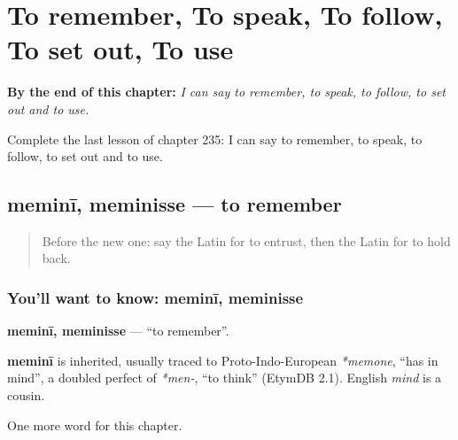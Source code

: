 
\chapter{To remember, To speak, To follow, To set out, To use}
\label{ch:la-to-remember-to-speak-to-follow-to-set-out-to-use}

\begin{chapteropening}
\textbf{By the end of this chapter:} \emph{I can say to remember, to speak, to follow, to set out and to use.}

Complete the last lesson of chapter 235: I can say to remember, to speak, to follow, to set out and to use.
\end{chapteropening}

\section[meminī, meminisse]{meminī, meminisse — to remember}

\label{lesson:LA-C235-memini}



\begin{quote}
Before the new one: say the Latin for to entrust, then the Latin for to hold back.
\end{quote}

\subsection*{You'll want to know: meminī, meminisse}
\textbf{meminī, meminisse} — \textquotedblleft{}to remember\textquotedblright{}.

\begin{cousinweb}
\textbf{meminī} is inherited, usually traced to Proto-Indo-European \emph{*memone}, \textquotedblleft{}has in mind\textquotedblright{}, a doubled perfect of \emph{*men-}, \textquotedblleft{}to think\textquotedblright{} (EtymDB 2.1). English \emph{mind} is a cousin.
\end{cousinweb}

\begin{grammarlens}[title={What you've built}]
One more word for this chapter.
\end{grammarlens}

